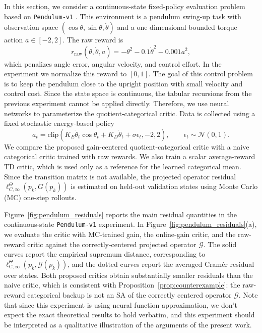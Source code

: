 \documentclass{article}
\begin{document}
In this section, we consider a continuous-state fixed-policy evaluation problem based on \texttt{Pendulum-v1} \citep{gym}. This environment is a pendulum swing-up task with observation space $(\cos\theta,\sin\theta,\dot\theta)$ and a one dimensional bounded torque action $a\in[-2,2]$. The raw reward is
\begin{equation}
r_{\mathrm{raw}}(\theta,\dot\theta,a) = -\theta^2 - 0.1\dot\theta^2 - 0.001a^2,
\end{equation}
which penalizes angle error, angular velocity, and control effort. In the experiment we normalize this reward to $[0,1]$. The goal of this control problem is to keep the pendulum close to the upright position with small velocity and control cost. Since the state space is continuous, the tabular recursions from the previous experiment cannot be applied directly. Therefore, we use neural networks to parameterize the quotient-categorical critic. Data is collected using a fixed stochastic energy-based policy
\begin{equation}
a_t = \mathrm{clip}\!\left(K_E \dot\theta_t \cos\theta_t + K_D \dot\theta_t + \sigma\epsilon_t, -2,2 \right), \qquad \epsilon_t\sim\mathcal N(0,1).
\end{equation}
We compare the proposed gain-centered quotient-categorical critic with a naive categorical critic trained with raw rewards. We also train a scalar average-reward TD critic, which is used only as a reference for the learned categorical mean. Since the transition matrix is not available, the projected operator residual $\ell^\Theta_{C,\infty}(p_k,G(p_k))$ is estimated on held-out validation states using Monte Carlo (MC) one-step rollouts.

Figure~\ref{fig:pendulum_residuals} reports the main residual quantities in the continuous-state \texttt{Pendulum-v1} experiment. In Figure~\ref{fig:pendulum_residuals}(a), we evaluate the critic with MC-trained gain, the online-gain critic, and the raw-reward critic against the correctly-centered projected operator $\mathcal G$. The solid curves report the empirical supremum distance, corresponding to $\ell^\Theta_{\mathrm C,\infty}(p_k,\mathcal G(p_k))$, and the dotted curves report the averaged Cram\'er residual over states. Both proposed critics obtain substantially smaller residuals than the naive critic, which is consistent with Proposition~\ref{prop:counterexample}: the raw-reward categorical backup is not an SA of the correctly centered operator $\mathcal G$. Note that since this experiment is using neural function approximation, we don't expect the exact theoretical results to hold verbatim, and this experiment should be interpreted as a qualitative illustration of the arguments of the present work.
\end{document}
